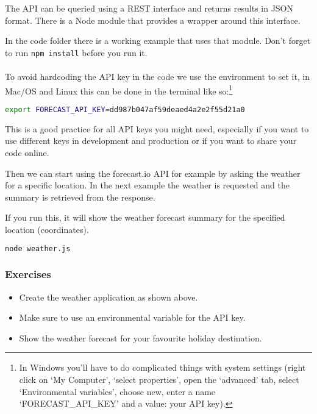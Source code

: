 \documentclass[a4paper]{report}
\begin{document}
The API can be queried using a REST interface and returns results in JSON format. There is a Node module that provides a wrapper around this interface. 
 
In the code folder there is a working example that uses that module. Don't forget to run \colorbox{codecol}{\lstinline[language=bash]{npm install}} before you run it. 
\\ 
\\ 
\noindent To avoid hardcoding the API key in the code we use the environment to set it, in Mac/OS and Linux this can be done in the terminal like so:\footnote{In Windows you'll have to do complicated things with system settings (right click on `My Computer', `select properties', open the `advanced' tab, select `Environmental variables', choose new, enter a name `FORECAST\_API\_KEY' and a value: your API key).} 
\begin{lstlisting}[language=bash] 
export FORECAST_API_KEY=dd987b047af59deaed4a2e2f55d21a0 
\end{lstlisting} 
 
\noindent This is a good practice for all API keys you might need, especially if you want to use different keys in development and production or if you want to share your code online. 
 
\noindent Then we can start using the forecast.io API for example by asking the weather for a specific location. In the next example the weather is requested and the summary is retrieved from the response. 
 
 
 
\noindent If you run this, it will show the weather forecast summary for the specified location (coordinates). 
 
\begin{lstlisting}[language=bash] 
node weather.js 
\end{lstlisting} 
 
\subsubsection*{Exercises} 
\begin{itemize} 
	\item Create the weather application as shown above. 
	\item Make sure to use an environmental variable for the API key. 
	\item Show the weather forecast for your favourite holiday destination. 
\end{itemize} 
 
\end{document}
